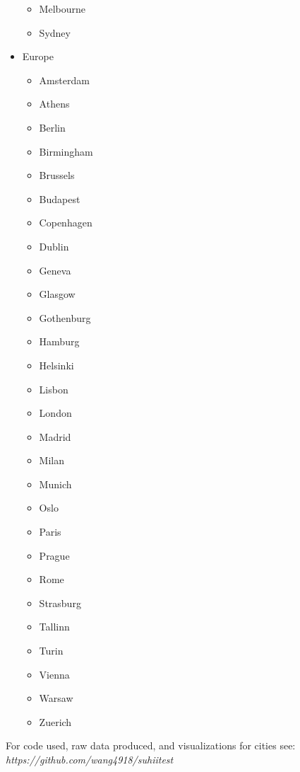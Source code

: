 \documentclass{article}
\begin{document}
\begin{itemize}
\begin{itemize}
        \item Melbourne
        \item Sydney
    \end{itemize}
    \item Europe
    \begin{itemize}
        \item Amsterdam
        \item Athens
        \item Berlin
        \item Birmingham
        \item Brussels
        \item Budapest
        \item Copenhagen
        \item Dublin
        \item Geneva
        \item Glasgow
        \item Gothenburg
        \item Hamburg
        \item Helsinki
        \item Lisbon
        \item London
        \item Madrid
        \item Milan
        \item Munich
        \item Oslo
        \item Paris
        \item Prague
        \item Rome
        \item Strasburg
        \item Tallinn
        \item Turin
        \item Vienna
        \item Warsaw
        \item Zuerich
    \end{itemize}
\end{itemize}

For code used, raw data produced, and visualizations for cities see:
\textit{https://github.com/wang4918/suhiitest}

\medskip

\printbibliography
\end{document}
